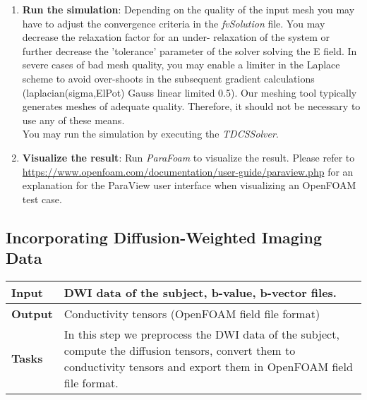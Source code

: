 \begin{enumerate}
    \item \textbf{Run the simulation}: Depending on the quality of the input mesh you may have to adjust the
    convergence criteria in the \emph{fvSolution} file. You may decrease the relaxation factor for an under-
    relaxation of the system or further decrease the 'tolerance' parameter of the solver solving the E field.
    In severe cases of bad mesh quality, you may enable a limiter in the Laplace scheme to avoid over-shoots
    in the subsequent gradient calculations (laplacian(sigma,ElPot)  Gauss linear limited 0.5). Our meshing
    tool typically generates meshes of adequate quality. Therefore, it should not be necessary to use any of
    these means.\\
    You may run the simulation by executing the \emph{TDCSSolver}.

    \item \textbf{Visualize the result}: Run \emph{ParaFoam} to visualize the result. Please refer to
    \url{https://www.openfoam.com/documentation/user-guide/paraview.php} for an explanation for the ParaView
    user interface when visualizing an OpenFOAM test case.
\end{enumerate}

\subsection{Incorporating Diffusion-Weighted Imaging Data}
\begin{tabular}{ | p{} || p{} | }
    \hline
    \textbf{Input}  & DWI data of the subject, b-value, b-vector files. \\
    \hline
    \textbf{Output} & Conductivity tensors (OpenFOAM field file format) \\
    \hline
    \textbf{Tasks} & In this step we preprocess the DWI data of the subject, compute the
                     diffusion tensors, convert them to conductivity tensors and export them
                     in OpenFOAM field file format.\\
    \hline
\end{tabular}

\hspace{0.5cm}

